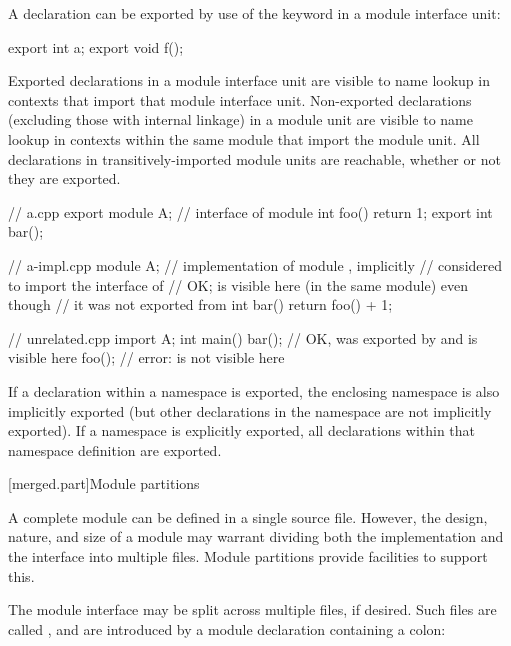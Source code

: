 \pnum
A declaration can be exported by use of the  keyword
in a module interface unit:
\begin{codeblock}
export int a;
export {
void f();
}
\end{codeblock}
Exported declarations in a module interface unit
are visible to name lookup
in contexts that import that module interface unit.
Non-exported declarations (excluding those with internal linkage)
in a module unit
are visible to name lookup
in contexts within the same module that import the module unit.
All declarations in transitively-imported module units
are reachable, whether or not they are exported.
\begin{example}
\begin{codeblock}
// a.cpp
export module A; // interface of module 
int foo() { return 1; }
export int bar();
\end{codeblock}

\begin{codeblock}
// a-impl.cpp
module A;        // implementation of module , implicitly
                 // considered to import the interface of 
// OK;  is visible here (in the same module) even though
// it was not exported from 
int bar() { return foo() + 1; }
\end{codeblock}

\begin{codeblock}
// unrelated.cpp
import A;
int main() {
  bar();         // OK,  was exported by  and is visible here
  foo();         // error:  is not visible here
}
\end{codeblock}
\end{example}

\pnum
If a declaration within a namespace is exported,
the enclosing namespace is also implicitly exported
(but other declarations in the namespace are not implicitly exported).
If a namespace is explicitly exported,
all declarations within that namespace definition are exported.

[merged.part]{Module partitions}

\pnum
A complete module can be defined in a single source file.
However, the design, nature, and size of a module may warrant
dividing both the implementation and the interface
into multiple files.
Module partitions provide facilities to support this.

\pnum
The module interface may be split across multiple files,
if desired.
Such files are called , and are
introduced by a module declaration containing a colon:

